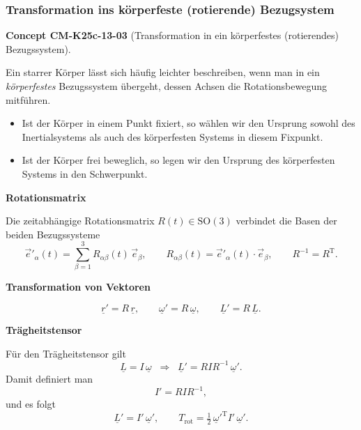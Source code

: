 \documentclass[10pt, letterpaper]{article}
\newcommand{\CustomHeading}[3]{%
  \par\medskip\noindent%
  \textbf{#1 #2} \textnormal{(#3)}.\enskip%
}
\newenvironment{CONC}[2]{\begin{unitbox}\CustomHeading{Concept}{#1}{#2}}{\end{unitbox}}
\begin{document}
\subsubsection{Transformation ins körperfeste (rotierende) Bezugsystem}




\begin{CONC}{CM-K25c-13-03}{Transformation in ein körperfestes (rotierendes) Bezugssystem}
Ein starrer Körper lässt sich häufig leichter beschreiben, wenn man in
ein \emph{körperfestes} Bezugssystem übergeht, dessen Achsen die
Rotationsbewegung mitführen.  

\begin{itemize}
  \item Ist der Körper in einem Punkt fixiert, so wählen wir den Ursprung
        sowohl des Inertialsystems als auch des körperfesten Systems in
        diesem Fixpunkt.

  \item Ist der Körper frei beweglich, so legen wir den Ursprung des
        körperfesten Systems in den Schwerpunkt.
\end{itemize}

\vspace{0.5em}

\textbf{Rotationsmatrix}

Die zeitabhängige Rotationsmatrix $R(t)\in\mathrm{SO}(3)$ verbindet die
Basen der beiden Bezugssysteme
\[
  \vec e'_\alpha(t)=\sum_{\beta=1}^{3}R_{\alpha\beta}(t)\,\vec e_\beta,
  \qquad
  R_{\alpha\beta}(t)=\vec e'_\alpha(t)\!\cdot\!\vec e_\beta,
  \qquad
  R^{-1}=R^{\mathrm T}.
\]

\textbf{Transformation von Vektoren}

\[
  \underline r' = R\,\underline r,
  \qquad
  \underline\omega' = R\,\underline\omega,
  \qquad
  \underline L' = R\,\underline L.
\]

\textbf{Trägheitstensor}

Für den Trägheitstensor gilt
\[
  \underline L = I\,\underline\omega
  \;\;\Longrightarrow\;\;
  \underline L' = RIR^{-1}\,\underline\omega'.
\]
Damit definiert man
\[
  I' = R I R^{-1},
\]
und es folgt
\[
  \underline L' = I'\,\underline\omega', 
  \qquad
  T_{\text{rot}} = \tfrac12\,\underline\omega'^{\!\mathrm T}
                   I'\,\underline\omega'.
\]


\end{CONC}
\end{document}
